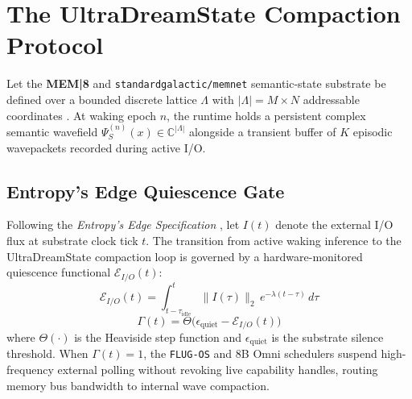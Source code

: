 \documentclass[10pt, twocolumn, a4paper]{article}
\begin{document}
\section{The UltraDreamState Compaction Protocol}

Let the \textbf{MEM|8} and \texttt{standardgalactic/memnet} semantic-state substrate be defined over a bounded discrete lattice $\Lambda$ with $|\Lambda| = M \times N$ addressable coordinates \cite{guimond2026memnet}. At waking epoch $n$, the runtime holds a persistent complex semantic wavefield $\Psi_S^{(n)}(x) \in \mathbb{C}^{|\Lambda|}$ alongside a transient buffer of $K$ episodic wavepackets recorded during active I/O.

\subsection{Entropy's Edge Quiescence Gate}
Following the \textit{Entropy's Edge Specification} \cite{guimond2026entropy}, let $I(t)$ denote the external I/O flux at substrate clock tick $t$. The transition from active waking inference to the UltraDreamState compaction loop is governed by a hardware-monitored quiescence functional $\mathcal{E}_{I/O}(t)$:
\begin{equation}
\mathcal{E}_{I/O}(t) = \int_{t - \tau_{\text{idle}}}^{t} \|I(\tau)\|_2 \, e^{-\lambda(t - \tau)} \, d\tau
\end{equation}
\begin{equation}
\Gamma(t) = \Theta\Big(\epsilon_{\text{quiet}} - \mathcal{E}_{I/O}(t)\Big)
\end{equation}
where $\Theta(\cdot)$ is the Heaviside step function and $\epsilon_{\text{quiet}}$ is the substrate silence threshold. When $\Gamma(t) = 1$, the \texttt{FLUG-OS} and 8B Omni schedulers suspend high-frequency external polling without revoking live capability handles, routing memory bus bandwidth to internal wave compaction.
\end{document}
